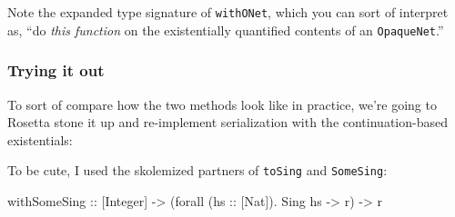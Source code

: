 \documentclass[]{article}
\newenvironment{Shaded}{}{}
\newcommand{\KeywordTok}[1]{\textcolor[rgb]{0.00,0.44,0.13}{\textbf{{#1}}}}
\newcommand{\DataTypeTok}[1]{\textcolor[rgb]{0.56,0.13,0.00}{{#1}}}
\newcommand{\CommentTok}[1]{\textcolor[rgb]{0.38,0.63,0.69}{\textit{{#1}}}}
\newcommand{\OtherTok}[1]{\textcolor[rgb]{0.00,0.44,0.13}{{#1}}}
\newcommand{\FunctionTok}[1]{\textcolor[rgb]{0.02,0.16,0.49}{{#1}}}
\newcommand{\NormalTok}[1]{{#1}}
\begin{document}
Note the expanded type signature of \texttt{withONet}, which you can sort of
interpret as, ``do \emph{this function} on the existentially quantified contents
of an \texttt{OpaqueNet}.''

\subsubsection{Trying it out}\label{trying-it-out}

To sort of compare how the two methods look like in practice, we're going to
Rosetta stone it up and re-implement serialization with the continuation-based
existentials:

\begin{Shaded}
\end{Shaded}

To be cute, I used the skolemized partners of \texttt{toSing} and
\texttt{SomeSing}:

\begin{Shaded}
\begin{Highlighting}[]
\OtherTok{withSomeSing ::} \NormalTok{[}\DataTypeTok{Integer}\NormalTok{]}
             \OtherTok{->} \NormalTok{(forall (}\OtherTok{hs ::} \NormalTok{[}\DataTypeTok{Nat}\NormalTok{])}\FunctionTok{.} \DataTypeTok{Sing} \NormalTok{hs }\OtherTok{->} \NormalTok{r)}
             \OtherTok{->} \NormalTok{r}
\end{Highlighting}
\end{Shaded}
\end{document}
